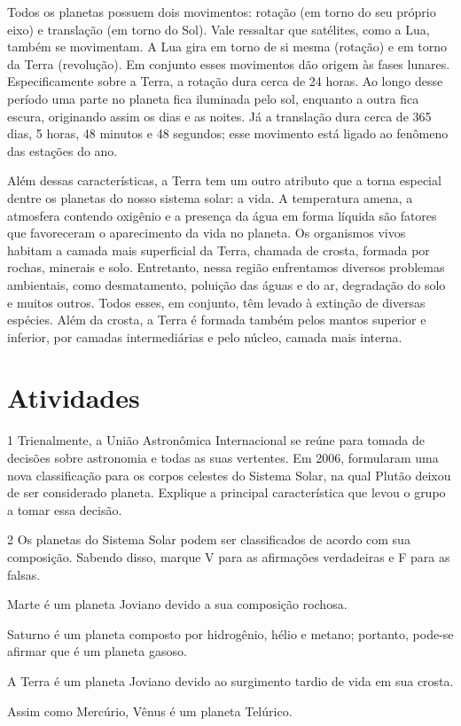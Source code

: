 {Todos os planetas possuem dois movimentos: rotação (em torno do seu
próprio eixo) e translação (em torno do Sol). Vale ressaltar que
satélites, como a Lua, também se movimentam. A Lua gira em torno de si
mesma (rotação) e em torno da Terra (revolução). Em conjunto esses
movimentos dão origem às fases lunares. Especificamente sobre a Terra, a
rotação dura cerca de 24 horas. Ao longo desse período uma parte no
planeta fica iluminada pelo sol, enquanto a outra fica escura,
originando assim os dias e as noites. Já a translação dura cerca de 365
dias, 5 horas, 48 minutos e 48 segundos; esse movimento está ligado ao fenômeno das estações do ano.

Além dessas características, a Terra tem um outro atributo que a torna
especial dentre os planetas do nosso sistema solar: a vida. A
temperatura amena, a atmosfera contendo oxigênio e a presença da água em
forma líquida são fatores que favoreceram o aparecimento da vida no
planeta. Os organismos vivos habitam a camada mais superficial da Terra,
chamada de crosta, formada por rochas, minerais e solo. Entretanto,
nessa região enfrentamos diversos problemas ambientais, como
desmatamento, poluição das águas e do ar, degradação do solo e muitos
outros. Todos esses, em conjunto, têm levado à extinção de diversas
espécies. Além da crosta, a Terra é formada também pelos mantos superior e
inferior, por camadas intermediárias e pelo núcleo, camada mais interna.}

\section{Atividades}

\num{1}  Trienalmente, a União Astronômica Internacional se reúne para tomada
  de decisões sobre astronomia e todas as suas vertentes. Em 2006,
  formularam uma nova classificação para os corpos celestes do Sistema
  Solar, na qual Plutão deixou de ser considerado planeta. Explique a
  principal característica que levou o grupo a tomar essa decisão.



\num{2} Os planetas do Sistema Solar podem ser classificados de acordo com sua
  composição. Sabendo disso, marque V para as afirmações verdadeiras e F para as falsas.

\begin{boxlist}
 Marte é um planeta Joviano devido a sua composição rochosa.

 Saturno é um planeta composto por hidrogênio, hélio e metano;
portanto, pode-se afirmar que é um planeta gasoso.

 A Terra é um planeta Joviano devido ao surgimento tardio de vida em
sua crosta.

 Assim como Mercúrio, Vênus é um planeta Telúrico.
\end{boxlist}

